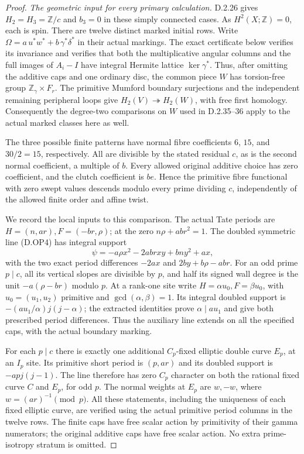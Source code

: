 \begin{proof}
\emph{The geometric input for every primary calculation.}
D.2.26 gives $H_2=H_3=\mathbb Z/c$ and $b_3=0$ in these
simply connected cases. As $H^2(X;\mathbb Z)=0$, each is spin.
There are twelve distinct marked initial rows. Write
$\Omega=a\,u^*w^*+b\,\gamma^*\delta^*$ in their actual markings.
The exact certificate below verifies its invariance and verifies
that both the multiplicative angular columns and the full images
of $A_i-I$ have integral Hermite lattice $\ker\gamma^*$.
Thus, after omitting the additive caps and one ordinary disc,
the common piece $W$ has torsion-free group
$\mathbb Z_\gamma\times F_r$. The primitive Mumford boundary
surjections and the independent remaining peripheral loops give
$H_2(V)\twoheadrightarrow H_2(W)$, with free first homology.
Consequently the degree-two comparisons on $W$ used in
D.2.35--36 apply to the actual marked classes here as well.

The three possible finite patterns have normal fibre coefficients
$6$, $15$, and $30/2=15$, respectively. All are divisible by
the stated residual $c$, as is the second normal coefficient,
a multiple of $b$. Every allowed original additive choice has
zero coefficient, and the clutch coefficient is $be$.
Hence the primitive fibre functional with zero swept values
descends modulo every prime dividing $c$, independently of
the allowed finite order and affine twist.

We record the local inputs to this comparison. The actual Tate
periods are $H=(n,ar),F=(-br,\rho)$; at the zero
$n\rho+ab r^2=1$. The doubled symmetric line (D.OP4) has
integral support
\[
          \psi=-a\rho x^2-2ab rxy+bn y^2+ax,
                                                        \tag{D.MT2}
\]
with the two exact period differences $-2ax$ and
$2by+b\rho-ab r$. For an odd prime $p\mid c$, all its
vertical slopes are divisible by $p$, and half its signed
wall degree is the unit $-a(\rho-br)$ modulo $p$.
At a rank-one site write $H=\alpha u_0,F=\beta u_0$, with
$u_0=(u_1,u_2)$ primitive and $\gcd(\alpha,\beta)=1$.
Its integral doubled support is
$-(a u_1/\alpha)j(j-\alpha)$; the extracted identities prove
$\alpha\mid a u_1$ and give both prescribed period differences.
Thus the auxiliary line extends on all the specified caps,
with the actual boundary marking.

For each $p\mid c$ there is exactly one additional
$C_p$-fixed elliptic double curve $E_p$, at an $I_p$ site.
Its primitive short period is $(p,ar)$ and its doubled support
is $-ap j(j-1)$. The line therefore has zero $C_p$ character
on both the rational fixed curve $C$ and $E_p$, for odd $p$.
The normal weights at $E_p$ are $w,-w$, where
$w=(ar)^{-1}\pmod p$. All these statements, including the
uniqueness of each fixed elliptic curve, are verified using
the actual primitive period columns in the twelve rows.
The finite caps have free scalar action by primitivity of
their gamma numerators; the original additive caps have
free scalar action. No extra prime-isotropy stratum is omitted.


\end{proof}
